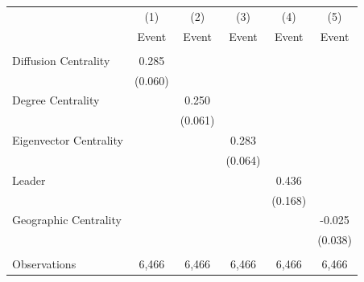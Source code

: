 \begin{tabular}{lccccc} \hline
 & (1) & (2) & (3) & (4) & (5) \\
 & Event & Event & Event & Event & Event \\ \hline
 &  &  &  &  &  \\
Diffusion Centrality & 0.285 &  &  &  &  \\
 & (0.060) &  &  &  &  \\
Degree Centrality &  & 0.250 &  &  &  \\
 &  & (0.061) &  &  &  \\
Eigenvector Centrality &  &  & 0.283 &  &  \\
 &  &  & (0.064) &  &  \\
Leader &  &  &  & 0.436 &  \\
 &  &  &  & (0.168) &  \\
Geographic Centrality &  &  &  &  & -0.025 \\
 &  &  &  &  & (0.038) \\
 &  &  &  &  &  \\
 Observations & 6,466 & 6,466 & 6,466 & 6,466 & 6,466 \\ \hline
\end{tabular}
